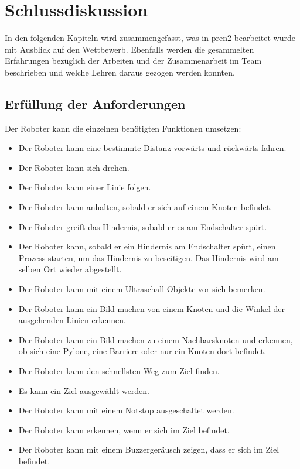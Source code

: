 \section{Schlussdiskussion}

In den folgenden Kapiteln wird zusammengefasst, was in \acrshort{pren2} bearbeitet wurde mit Ausblick auf den Wettbewerb.
Ebenfalls werden die gesammelten Erfahrungen bezüglich der Arbeiten und der Zusammenarbeit im Team beschrieben und welche Lehren daraus gezogen werden konnten.

\subsection{Erfüllung der Anforderungen}

Der Roboter kann die einzelnen benötigten Funktionen umsetzen:

\begin{itemize}
    \item Der Roboter kann eine bestimmte Distanz vorwärts und rückwärts fahren.
    \item Der Roboter kann sich drehen.
    \item Der Roboter kann einer Linie folgen.
    \item Der Roboter kann anhalten, sobald er sich auf einem Knoten befindet.
    \item Der Roboter greift das Hindernis, sobald er es am Endschalter spürt.
    \item Der Roboter kann, sobald er ein Hindernis am Endschalter spürt, einen Prozess starten, um das Hindernis zu beseitigen. Das Hindernis wird am selben Ort wieder abgestellt.
    \item Der Roboter kann mit einem Ultraschall Objekte vor sich bemerken.
    \item Der Roboter kann ein Bild machen von einem Knoten und die Winkel der ausgehenden Linien erkennen.
    \item Der Roboter kann ein Bild machen zu einem Nachbarsknoten und erkennen, ob sich eine Pylone, eine Barriere oder nur ein Knoten dort befindet.
    \item Der Roboter kann den schnellsten Weg zum Ziel finden.
    \item Es kann ein Ziel ausgewählt werden.
    \item Der Roboter kann mit einem Notstop ausgeschaltet werden.
    \item Der Roboter kann erkennen, wenn er sich im Ziel befindet.
    \item Der Roboter kann mit einem Buzzergeräusch zeigen, dass er sich im Ziel befindet.
\end{itemize}

